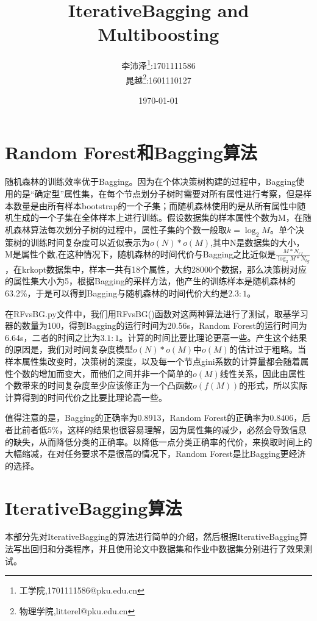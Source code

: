 \documentclass[a4paper,oneside,12pt]{article}
\title{IterativeBagging and Multiboosting}
\author{李沛泽\footnote{工学院,1701111586@pku.edu.cn}:1701111586 \\晁越\footnote{物理学院,litterel@pku.edu.cn}:1601110127}
\date{\today}
\begin{document}

\begin{spacing}{1.5}%

\maketitle
\newpage
\tableofcontents
\newpage

\section{Random Forest和Bagging算法}
随机森林的训练效率优于Bagging。因为在个体决策树构建的过程中，Bagging使用的是“确定型”属性集，在每个节点划分子树时需要对所有属性进行考察，但是样本数量是由所有样本bootstrap的一个子集；而随机森林使用旳是从所有属性中随机生成的一个子集在全体样本上进行训练。假设数据集的样本属性个数为M，在随机森林算法每次划分子树的过程中，属性子集的个数一般取$k=\log_2M$。单个决策树的训练时间复杂度可以近似表示为$o(N)*o(M)$,其中N是数据集的大小，M是属性个数,在这种情况下，随机森林的时间代价与Bagging之比近似是$\frac{M*N_{rf}}{\log_2M*N_{bg}}$，在krkopt数据集中，样本一共有18个属性，大约28000个数据，那么决策树对应的属性集大小为5，根据Bagging的采样方法，他产生的训练样本是随机森林的63.2\%，于是可以得到Bagging与随机森林的时间代价大约是$2.3:1$。\par
在RFvsBG.py文件中，我们用RFvsBG()函数对这两种算法进行了测试，取基学习器的数量为100，得到Bagging的运行时间为20.56s，Random Forest的运行时间为6.64s，二者的时间之比为$3.1:1$。计算的时间比要比理论更高一些。产生这个结果的原因是，我们对时间复杂度模型$o(N)*o(M)$中$o(M)$的估计过于粗略。当样本属性集改变时，决策树的深度，以及每一个节点gini系数的计算量都会随着属性个数的增加而变大，而他们之间并非一个简单的$o(M)$线性关系，因此由属性个数带来的时间复杂度至少应该修正为一个凸函数$o(f(M))$的形式，所以实际计算得到的时间代价之比要比理论高一些。\par
值得注意的是，Bagging的正确率为0.8913，Random Forest的正确率为0.8406，后者比前者低5\%，这样的结果也很容易理解，因为属性集的减少，必然会导致信息的缺失，从而降低分类的正确率。以降低一点分类正确率的代价，来换取时间上的大幅缩减，在对任务要求不是很高的情况下，Random Forest是比Bagging更经济的选择。
\section{IterativeBagging算法\cite{Breiman:2001:UIB:514915.514917}}
本部分先对IterativeBagging的算法进行简单的介绍，然后根据IterativeBagging算法写出回归和分类程序，并且使用论文中数据集和作业中数据集分别进行了效果测试。

\end{spacing}
\end{document}
